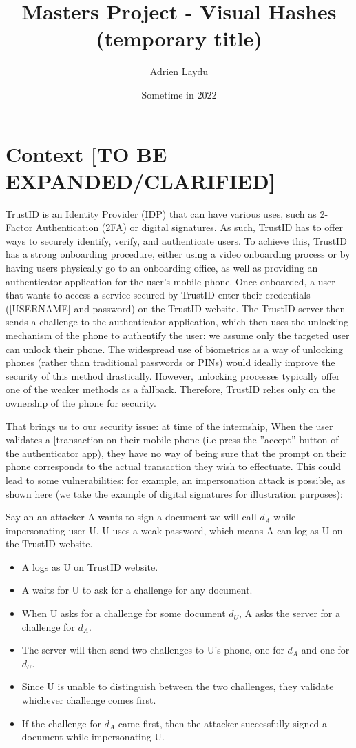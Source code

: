 \documentclass{article}
\title{Masters Project - Visual Hashes (temporary title)}
\author{Adrien Laydu}
\date{Sometime in 2022}
\begin{document}
\maketitle
\section{Context [TO BE EXPANDED/CLARIFIED]}

TrustID is an Identity Provider (IDP) that can have various uses, such as 2-Factor Authentication (2FA) or digital signatures. As such, TrustID has to offer ways to securely identify, verify, and authenticate users. To achieve this, TrustID has a strong onboarding procedure, either using a video onboarding process or by having users physically go to an onboarding office, as well as providing an authenticator application for the user's mobile phone. Once onboarded, a user that wants to access a service secured by TrustID enter their credentials ([USERNAME] and password) on the TrustID website. The TrustID server then sends a challenge to the authenticator application, which then uses the unlocking mechanism of the phone to authentify the user: we assume only the targeted user can unlock their phone. The widespread use of biometrics as a way of unlocking phones (rather than traditional passwords or PINs) would ideally improve the security of this method drastically. However, unlocking processes typically offer one of the weaker methods as a fallback. Therefore, TrustID relies only on the ownership of the phone for security.

\vspace{4pt}
That brings us to our security issue: at time of the internship, When the user validates a [transaction on their mobile phone (i.e press the ”accept” button of the authenticator app), they have no way of being sure that the prompt on their phone corresponds to the actual transaction they wish to effectuate. This could lead to some vulnerabilities: for example, an impersonation attack is possible, as shown here (we take the example of digital signatures for illustration purposes):

Say an an attacker A wants to sign a document we will call $d_A$ while impersonating user U. U uses a weak password, which means A can log as U on the TrustID website.
\begin{itemize}
    \item A logs as U on TrustID website.
    \item A waits for U to ask for a challenge for any document.
    \item When U asks for a challenge for some document $d_U$, A asks the server for a challenge for $d_A$.
    \item The server will then send two challenges to U’s phone, one for $d_A$ and one for $d_U$.
    \item Since U is unable to distinguish between the two challenges, they validate whichever challenge comes first.
    \item If the challenge for $d_A$ came first, then the attacker successfully signed a document while impersonating U.
\end{itemize}
\end{document}
